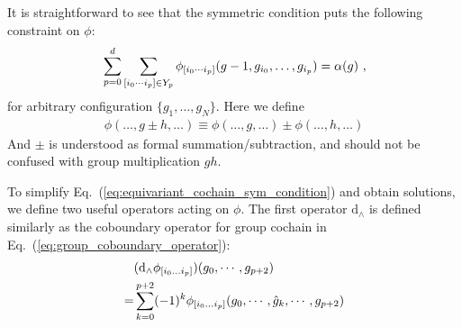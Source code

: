 \documentclass[reprint,amsmath,amssymb,aps,pra,]{revtex4-1}
\newcommand{\dd}{\mathrm{d}} %
\begin{document}
It is straightforward to see that the symmetric condition puts the following constraint on $\phi$:
\begin{align}
  &\sum_{p=0}^d\sum_{[i_0\cdots i_{p}]\in Y_p}\phi_{[i_0\cdots i_{p}]}(g-1,g_{i_0},\dots,g_{i_{p}})=\alpha(g)~,\notag\\ 
  \label{eq:equivariant_cochain_sym_condition}
\end{align}
for arbitrary configuration $\{g_1,\ldots,g_N\}$.
Here we define
\begin{align}
  \phi(\ldots,g\pm h,\ldots)\equiv \phi(\ldots,g,\ldots)\pm \phi(\ldots,h,\ldots)
\end{align}
And $\pm$ is understood as formal summation/subtraction, and should not be confused with group multiplication $gh$.


To simplify Eq.~(\ref{eq:equivariant_cochain_sym_condition}) and obtain solutions, we define two useful operators acting on $\phi$.
The first operator $\dd_\wedge$ is defined similarly as the coboundary operator for group cochain in Eq.~(\ref{eq:group_coboundary_operator}):
\begin{align}
  &(\dd_\wedge\phi_{[i_0\ldots i_{p}]})(g_0,\cdots,g_{p+2})\notag\\
  =&\sum_{k=0}^{p+2}(-1)^k\phi_{[i_0\ldots i_{p}]}(g_0,\cdots,\hat{g}_k,\cdots,g_{p+2})
  \label{eq:up_coboundary}
\end{align}
\end{document}

